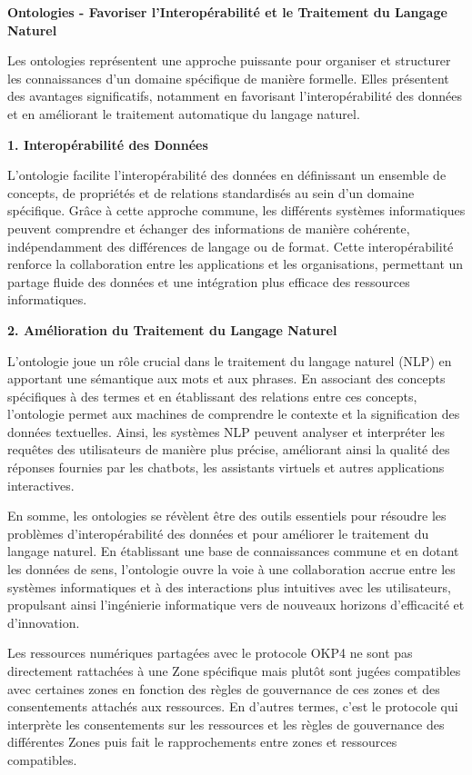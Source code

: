 \begin{tcolorbox}
\textbf{Ontologies - Favoriser l'Interopérabilité et le Traitement du Langage Naturel}


Les ontologies représentent une approche puissante pour organiser et structurer les connaissances d'un domaine spécifique de manière formelle. Elles présentent des avantages significatifs, notamment en favorisant l'interopérabilité des données et en améliorant le traitement automatique du langage naturel.

\textbf{1. Interopérabilité des Données}

L'ontologie facilite l'interopérabilité des données en définissant un ensemble de concepts, de propriétés et de relations standardisés au sein d'un domaine spécifique. Grâce à cette approche commune, les différents systèmes informatiques peuvent comprendre et échanger des informations de manière cohérente, indépendamment des différences de langage ou de format. Cette interopérabilité renforce la collaboration entre les applications et les organisations, permettant un partage fluide des données et une intégration plus efficace des ressources informatiques.

\textbf{2. Amélioration du Traitement du Langage Naturel}

L'ontologie joue un rôle crucial dans le traitement du langage naturel (NLP) en apportant une sémantique aux mots et aux phrases. En associant des concepts spécifiques à des termes et en établissant des relations entre ces concepts, l'ontologie permet aux machines de comprendre le contexte et la signification des données textuelles. Ainsi, les systèmes NLP peuvent analyser et interpréter les requêtes des utilisateurs de manière plus précise, améliorant ainsi la qualité des réponses fournies par les chatbots, les assistants virtuels et autres applications interactives.

En somme, les ontologies se révèlent être des outils essentiels pour résoudre les problèmes d'interopérabilité des données et pour améliorer le traitement du langage naturel. En établissant une base de connaissances commune et en dotant les données de sens, l'ontologie ouvre la voie à une collaboration accrue entre les systèmes informatiques et à des interactions plus intuitives avec les utilisateurs, propulsant ainsi l'ingénierie informatique vers de nouveaux horizons d'efficacité et d'innovation.


\end{tcolorbox}

Les ressources numériques partagées avec le protocole OKP4 ne sont pas directement rattachées à une Zone spécifique mais plutôt sont jugées compatibles avec certaines zones en fonction des règles de gouvernance de ces zones et des consentements attachés aux ressources. En d'autres termes, c'est le protocole qui interprète les consentements sur les ressources et les règles de gouvernance des différentes Zones puis fait le rapprochements entre zones et ressources compatibles.

